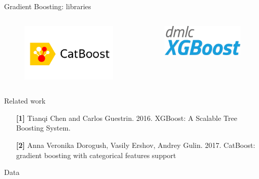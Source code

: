 \begin{frame}{Gradient Boosting: libraries}
\begin{columns}
		
		\begin{column}{0.33\textwidth}
			\centering
			\begin{figure}
				\includegraphics[width=\columnwidth]{figures/catboost}
			\end{figure}
		\end{column}
		
		\begin{column}{0.33\textwidth}
			\centering
			\begin{figure}
				\includegraphics[width=\columnwidth]{figures/xgboost}
			\end{figure}
		\end{column}
		
	\end{columns}
\end{frame}


\begin{frame}{Related work}
	\begin{enumerate}
		\item[\textbf{[1]}] Tianqi Chen and Carlos Guestrin. 2016. XGBoost: A Scalable Tree Boosting System. 
		\item[\textbf{[2]}] Anna Veronika Dorogush, Vasily Ershov, Andrey Gulin. 2017. CatBoost: gradient boosting with categorical features support
	\end{enumerate}
\end{frame}

\begin{frame}{Data}
	
\end{frame}
